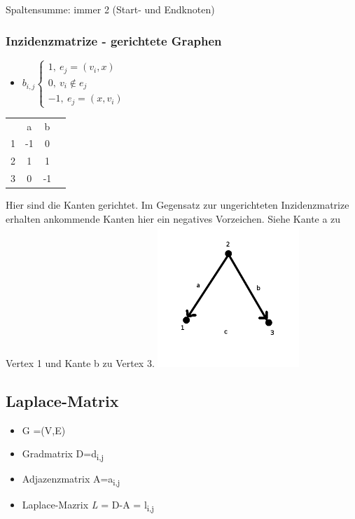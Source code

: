 Spaltensumme: immer 2 (Start- und Endknoten)

\subsubsection{Inzidenzmatrize - gerichtete Graphen}
\begin{itemize}
	\item $b_{i,j}
	\begin{cases}
		1,\>e_j=(v_i,x)\\
		0,\>v_i \notin e_j\\
		-1,\>e_j=(x,v_i)\end{cases}$
\end{itemize}

\begin{tabular}{cccc}
 & a & b\\
1 & -1 & 0\\
2 & 1 & 1\\
3 & 0 & -1\\
\end{tabular}\newline\newline
Hier sind die Kanten gerichtet. Im Gegensatz zur ungerichteten Inzidenzmatrize erhalten \glqq ankommende\grqq{} Kanten hier ein negatives Vorzeichen. Siehe Kante a zu Vertex 1 und Kante b zu Vertex 3.\newline
\includegraphics[width=0.4\textwidth]{lectures/161028/pix/dreieckge.png}

\newpage

\subsection{Laplace-Matrix}
\begin{itemize}
	\item G =(V,E)
	\item Gradmatrix D=d\textsubscript{i,j}
	\item Adjazenzmatrix A=a\textsubscript{i,j}
	\item Laplace-Mazrix \textit L = D-A = l\textsubscript{i,j}
\end{itemize}

